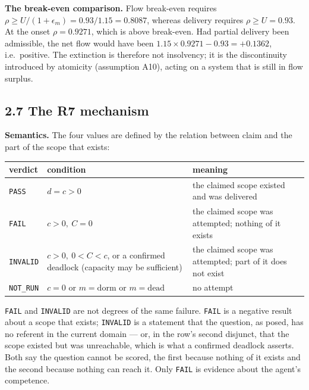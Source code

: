 \documentclass[11pt,a4paper]{article}
\newcounter{none}
\begin{document}
\textbf{The break-even comparison.} Flow break-even requires
\(\rho\ge U/(1+\epsilon_m)=0.93/1.15=0.8087\), whereas delivery requires
\(\rho\ge U=0.93\). At the onset \(\rho=0.9271\), which is above break-even. Had
partial delivery been admissible, the net flow would have been
\(1.15\times0.9271-0.93=+0.1362\), i.e.~positive. The extinction is therefore not
insolvency; it is the discontinuity introduced by atomicity (assumption A10),
acting on a system that is still in flow surplus.

\subsection{2.7 The R7 mechanism}\label{the-r7-mechanism}

\textbf{Semantics.} The four values are defined by the relation between claim and the
part of the scope that exists:

{\def\LTcaptype{none} %
\begin{longtable}[]{@{}
  >{\raggedright\arraybackslash}p{}
  >{\raggedright\arraybackslash}p{}
  >{\raggedright\arraybackslash}p{}@{}}
\toprule\noalign{}
\begin{minipage}[b]{\linewidth}\raggedright
verdict
\end{minipage} & \begin{minipage}[b]{\linewidth}\raggedright
condition
\end{minipage} & \begin{minipage}[b]{\linewidth}\raggedright
meaning
\end{minipage} \\
\midrule\noalign{}
\endhead
\bottomrule\noalign{}
\endlastfoot
\texttt{PASS} & \(d=c>0\) & the claimed scope existed and was delivered \\
\texttt{FAIL} & \(c>0,\ C=0\) & the claimed scope was attempted; nothing of it exists \\
\texttt{INVALID} & \(c>0,\ 0<C<c\), or a confirmed deadlock (capacity may be sufficient) & the claimed scope was attempted; part of it does not exist \\
\texttt{NOT\_RUN} & \(c=0\) or \(m=\mathrm{dorm}\) or \(m=\mathrm{dead}\) & no attempt \\
\end{longtable}
}

\texttt{FAIL} and \texttt{INVALID} are not degrees of the same failure. \texttt{FAIL} is a negative
result about a scope that exists; \texttt{INVALID} is a statement that the question, as
posed, has no referent in the current domain --- or, in the row's second
disjunct, that the scope existed but was unreachable, which is what a confirmed
deadlock asserts. Both say the question cannot be scored, the first because
nothing of it exists and the second because nothing can reach it. Only \texttt{FAIL} is
evidence about the agent's competence.
\end{document}
